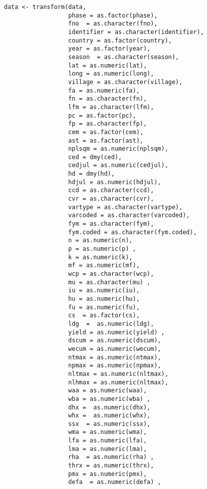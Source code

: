 \documentclass[idxtotoc,hyperref,openany]{labbook} %
\begin{document}
\begin{lstlisting}
data <- transform(data, 
                  phase = as.factor(phase),
                  fno  = as.character(fno),
                  identifier = as.character(identifier),
                  country = as.factor(country),
                  year = as.factor(year),
                  season  = as.character(season),   
                  lat = as.numeric(lat),
                  long = as.numeric(long),      
                  village = as.character(village), 
                  fa = as.numeric(fa),
                  fn = as.character(fn),
                  lfm = as.character(lfm),
                  pc = as.factor(pc),
                  fp = as.character(fp),        
                  cem = as.factor(cem),     
                  ast = as.factor(ast),       
                  nplsqm = as.numeric(nplsqm),
                  ced = dmy(ced),       
                  cedjul = as.numeric(cedjul),
                  hd = dmy(hd),
                  hdjul = as.numeric(hdjul),     
                  ccd = as.character(ccd),
                  cvr = as.character(cvr),
                  vartype = as.character(vartype),
                  varcoded = as.character(varcoded),
                  fym = as.character(fym),
                  fym.coded = as.character(fym.coded),
                  n = as.numeric(n),
                  p = as.numeric(p) ,
                  k = as.numeric(k),
                  mf = as.numeric(mf),        
                  wcp = as.character(wcp),      
                  mu = as.character(mu) ,     
                  iu = as.numeric(iu),     
                  hu = as.numeric(hu),      
                  fu = as.numeric(fu),      
                  cs  = as.factor(cs),      
                  ldg  =  as.numeric(ldg),  
                  yield = as.numeric(yield) ,
                  dscum = as.numeric(dscum),   
                  wecum = as.numeric(wecum),   
                  ntmax = as.numeric(ntmax), 
                  npmax = as.numeric(npmax),    
                  nltmax = as.numeric(nltmax),  
                  nlhmax = as.numeric(nltmax),  
                  waa = as.numeric(waa),      
                  wba = as.numeric(wba) ,   
                  dhx =  as.numeric(dhx),  
                  whx =  as.numeric(whx),     
                  ssx  = as.numeric(ssx),  
                  wma = as.numeric(wma), 
                  lfa = as.numeric(lfa),
                  lma = as.numeric(lma),   
                  rha  = as.numeric(rha) ,
                  thrx = as.numeric(thrx),    
                  pmx = as.numeric(pmx),    
                  defa  = as.numeric(defa) ,

\end{lstlisting}
\end{document}
